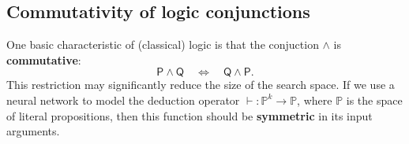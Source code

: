 \documentclass[orivec]{llncs}
\newcommand{\vect}[1]{\boldsymbol{#1}}
\newcommand*\bbTheta{\vcenter{\hbox{\texttt{[image: ../bbTheta.png]}}}}
\begin{document}

\subsection{Commutativity of logic conjunctions}
\label{sec:commutative-structure}

One basic characteristic of (classical) logic is that the conjuction $\wedge$ is \textbf{commutative}:
\begin{equation}
\mathsf{P} \wedge \mathsf{Q} \quad \Leftrightarrow \quad \mathsf{Q} \wedge \mathsf{P} .
\end{equation}
This restriction may significantly reduce the size of the search space.  If we use a neural network to model the deduction operator $\vdash: \mathbb{P}^k \rightarrow \mathbb{P}$, where $\mathbb{P}$ is the space of literal propositions, then this function should be \textbf{symmetric} in its input arguments.
\end{document}
